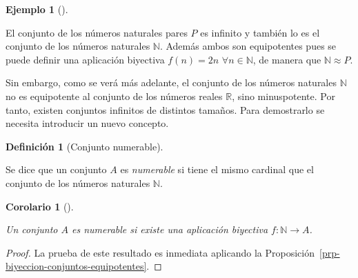 \documentclass[
  a4paper,
]{scrreport}
\theoremstyle{definition}
\newtheorem{definition}{Definición}[chapter]
\theoremstyle{plain}
\theoremstyle{plain}
\theoremstyle{definition}
\theoremstyle{definition}
\newtheorem{example}{Ejemplo}[chapter]
\theoremstyle{plain}
\newtheorem{corollary}{Corolario}[chapter]
\theoremstyle{remark}
\begin{document}
\begin{example}[]\protect\hypertarget{exm-conjunto-pares-equipotente-naturales}{}\label{exm-conjunto-pares-equipotente-naturales}

El conjunto de los números naturales pares \(P\) es infinito y también
lo es el conjunto de los números naturales \(\mathbb{N}\). Además ambos
son equipotentes pues se puede definir una aplicación biyectiva
\(f(n) = 2n\) \(\forall n\in\mathbb{N}\), de manera que
\(\mathbb{N}\approx P\).

\end{example}

Sin embargo, como se verá más adelante, el conjunto de los números
naturales \(\mathbb{N}\) no es equipotente al conjunto de los números
reales \(\mathbb{R}\), sino minuspotente. Por tanto, existen conjuntos
infinitos de distintos tamaños. Para demostrarlo se necesita introducir
un nuevo concepto.

\begin{definition}[Conjunto
numerable]\protect\hypertarget{def-conjuntos-numerables}{}\label{def-conjuntos-numerables}

Se dice que un conjunto \(A\) es \emph{numerable} si tiene el mismo
cardinal que el conjunto de los números naturales \(\mathbb{N}\).

\end{definition}

\begin{corollary}[]\protect\hypertarget{cor-biyeccion-conjunto-numerable}{}\label{cor-biyeccion-conjunto-numerable}

Un conjunto \(A\) es numerable si existe una aplicación biyectiva
\(f:\mathbb{N}\rightarrow A\).

\end{corollary}

\begin{tcolorbox}[enhanced jigsaw, breakable, title=\textcolor{quarto-callout-note-color}{\faInfo}\hspace{0.5em}{Demostración}, toprule=.15mm, coltitle=black, arc=.35mm, rightrule=.15mm, colframe=quarto-callout-note-color-frame, colbacktitle=quarto-callout-note-color!10!white, toptitle=1mm, titlerule=0mm, leftrule=.75mm, opacityback=0, colback=white, bottomrule=.15mm, bottomtitle=1mm, left=2mm, opacitybacktitle=0.6]

\begin{proof}

La prueba de este resultado es inmediata aplicando la
Proposición~\ref{prp-biyeccion-conjuntos-equipotentes}.

\end{proof}

\end{tcolorbox}
\end{document}
